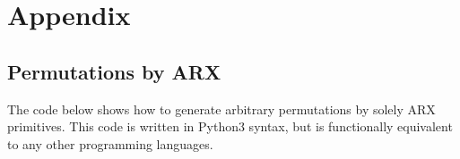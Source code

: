 \section*{Appendix}

\renewcommand\thesubsection{\Alph{subsection}}

\subsection{Permutations by ARX}
\label{ssec:permarx}

The code below shows how to generate arbitrary permutations by solely ARX primitives.
This code is written in Python3 syntax, but is functionally equivalent to any other
programming languages.

\begin{figure}[h!]

\vspace{-5mm}
\end{figure}



%
